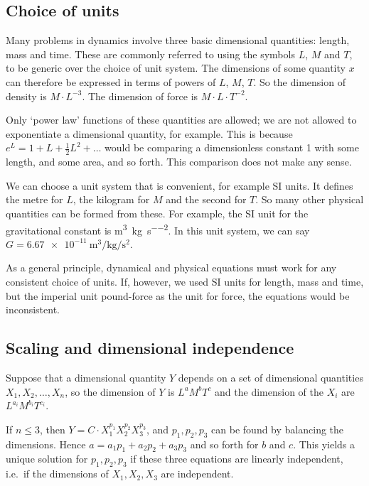 \subsection{Choice of units}
Many problems in dynamics involve three basic dimensional quantities: length, mass and time.
These are commonly referred to using the symbols \(L\), \(M\) and \(T\), to be generic over the choice of unit system.
The dimensions of some quantity \(x\) can therefore be expressed in terms of powers of \(L\), \(M\), \(T\).
So the dimension of density is \(M \cdot L^{-3}\).
The dimension of force is \(M \cdot L \cdot T^{-2}\).

Only `power law' functions of these quantities are allowed; we are not allowed to exponentiate a dimensional quantity, for example.
This is because \(e^L = 1 + L + \frac{1}{2}L^2 + \dots\) would be comparing a dimensionless constant 1 with some length, and some area, and so forth.
This comparison does not make any sense.

We can choose a unit system that is convenient, for example SI units.
It defines the metre for \(L\), the kilogram for \(M\) and the second for \(T\).
So many other physical quantities can be formed from these.
For example, the SI unit for the gravitational constant is \si{\metre\cubed\per\kilogram\per\second\squared}.
In this unit system, we can say \(G = \SI{6.67e-11}{\metre\cubed\per\kilogram\per\second\squared}\).

As a general principle, dynamical and physical equations must work for any consistent choice of units.
If, however, we used SI units for length, mass and time, but the imperial unit pound-force as the unit for force, the equations would be inconsistent.

\subsection{Scaling and dimensional independence}
Suppose that a dimensional quantity \(Y\) depends on a set of dimensional quantities \(X_1, X_2, \dots, X_n\), so the dimension of \(Y\) is \(L^a M^b T^c\) and the dimension of the \(X_i\) are \(L^{a_i} M^{b_i} T^{c_i}\).

If \(n \leq 3\), then \(Y = C \cdot X_1^{p_1}X_2^{p_2}X_3^{p_3}\), and \(p_1, p_2, p_3\) can be found by balancing the dimensions.
Hence \(a = a_1p_1 + a_2p_2 + a_3p_3\) and so forth for \(b\) and \(c\).
This yields a unique solution for \(p_1, p_2, p_3\) if these three equations are linearly independent, i.e.\ if the dimensions of \(X_1, X_2, X_3\) are independent.

